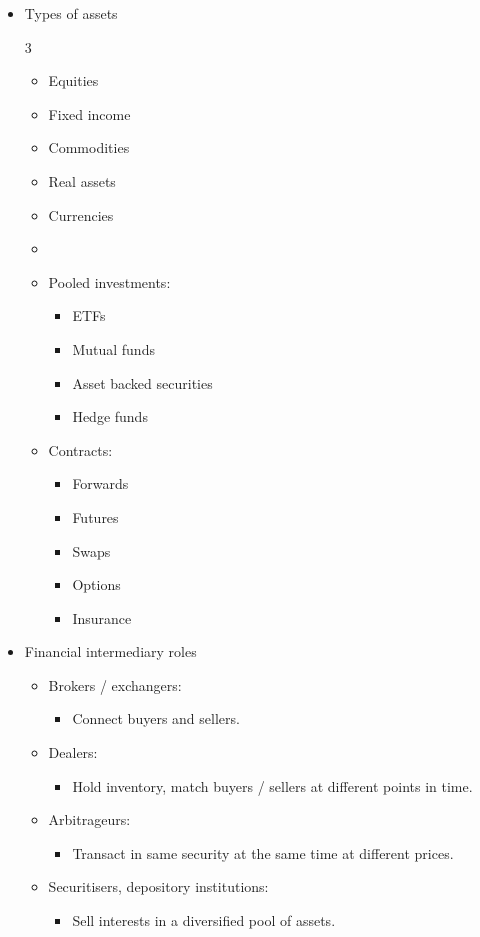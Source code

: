 \documentclass[../notes_compiled.tex]{subfiles}
\begin{document}
\begin{itemize}
\item Types of assets
\begin{multicols}{3}
\begin{itemize}
\item Equities
\item Fixed income
\item Commodities
\item Real assets
\item Currencies
\item[]
\item Pooled investments:
\begin{itemize}
\item ETFs
\item Mutual funds
\item Asset backed securities
\item Hedge funds
\end{itemize}
\item Contracts:
\begin{itemize}
\item Forwards
\item Futures
\item Swaps
\item Options
\item Insurance
\end{itemize}
\end{itemize}
\end{multicols}

\item Financial intermediary roles
\begin{itemize}
\item Brokers / exchangers:
\begin{itemize}
\item Connect buyers and sellers.
\end{itemize}

\item Dealers:
\begin{itemize}
\item Hold inventory, match buyers / sellers at different points in time.
\end{itemize}

\item Arbitrageurs:
\begin{itemize}
\item Transact in same security at the same time at different prices.
\end{itemize}

\item Securitisers, depository institutions:
\begin{itemize}
\item Sell interests in a diversified pool of assets.
\end{itemize}


\end{itemize}
\end{itemize}
\end{document}
